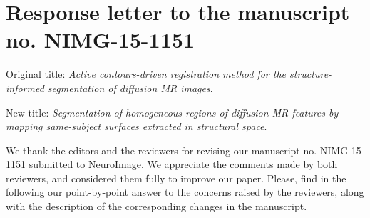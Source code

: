 \documentclass[9pt]{memoir}
\begin{document}
\section*{Response letter to the manuscript no. NIMG-15-1151}
\medskip
Original title: \emph{Active contours-driven registration method for the structure-informed segmentation of
  diffusion MR images}.

\noindent New title: \emph{\color{red} Segmentation of homogeneous regions of diffusion MR features by mapping
  same-subject surfaces extracted in structural space}.

\bigskip
\noindent We thank the editors and the reviewers for revising our manuscript no. NIMG-15-1151 submitted to NeuroImage.
We appreciate the comments made by both reviewers, and considered them fully to improve our paper.
Please, find in the following our point-by-point answer to the concerns raised by the reviewers,
  along with the description of the corresponding changes in the manuscript.

\bigskip
\bigskip
\end{document}

